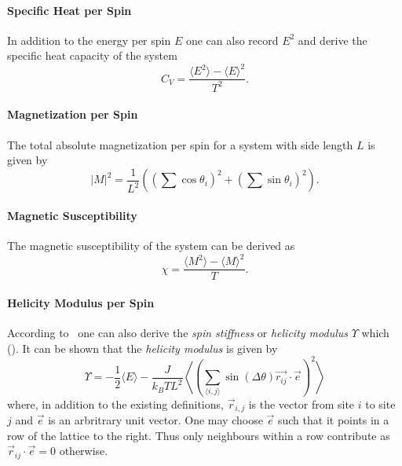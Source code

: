 		\paragraph{Specific Heat per Spin}
			In addition to the energy per spin $E$ one can also record $E^2$ and derive the specific heat capacity of the system
			\begin{equation}
				C_V = \frac{\langle E^2 \rangle - \langle E \rangle^2}{T^2}.
			\end{equation}
		
		\paragraph{Magnetization per Spin}
			The total absolute magnetization per spin for a system with side length $L$ is given by
			\begin{equation}
				\lvert M \rvert^2 = \frac{1}{L^2} \left( (\sum{\cos\theta_i})^2 + (\sum{\sin\theta_i})^2 \right).
			\end{equation}
		
		\paragraph{Magnetic Susceptibility}
			The magnetic susceptibility of the system can be derived as
			\begin{equation}
				\chi = \frac{\langle M^2 \rangle - \langle M \rangle^2}{T}.
			\end{equation}
		
		\paragraph{Helicity Modulus per Spin}
			According to~\cite{teitel_helicity} one can also derive the \emph{spin stiffness} or \emph{helicity modulus} $\Upsilon$ which  (\cite{teitel_helicity}). It can be shown that the \emph{helicity modulus} is given by
			\begin{equation}
				\Upsilon = -\frac{1}{2} \langle E \rangle - \frac{J}{k_B T L^2} \left\langle \left(\sum_{\langle i,j \rangle}{\sin(\Delta \theta) \vec{r_{ij}} \cdot \vec{e}}\right)^2 \right\rangle
			\end{equation}
			\cite[eq. 3.2]{teitel_helicity} where, in addition to the existing definitions, $\vec{r}_{i,j}$ is the vector from site $i$ to site $j$ and $\vec{e}$ is an arbritrary unit vector. One may choose $\vec{e}$ such that it points in a row of the lattice to the right. Thus only neighbours within a row contribute as $\vec{r}_{ij} \cdot \vec{e} = 0$ otherwise.
	
